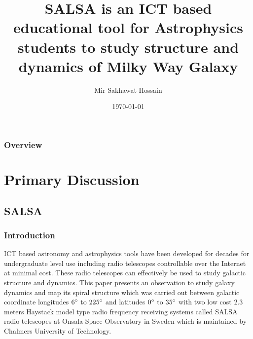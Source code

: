 \documentclass{beamer}
\title[SALSA]{SALSA is an ICT based educational tool for Astrophysics students to study structure and dynamics of Milky Way Galaxy } %
\author{Mir Sakhawat Hossain} %
\institute[KNC] %
{
Kabi Nazrul Govt. College,Dhaka \\ %
\medskip
\textit{s.hossain18@gmail.com} \\ %
\textit{\url{https://gitlab.com/sakhawat18/iccit-2018}} %
}
\date{\today} %
\begin{document}
\begin{frame}
\titlepage %
\end{frame}

\begin{frame}
\frametitle{Overview} %
\tableofcontents %
\end{frame}


\section{Primary Discussion} %

\subsection{SALSA} %

\begin{frame}
\frametitle{Introduction}
ICT based astronomy and astrophysics tools have been developed for decades for undergraduate level use including radio telescopes controllable over the Internet at minimal cost. These radio telescopes can effectively be used to study galactic structure and dynamics. This paper presents an observation to study galaxy dynamics and map its spiral structure which was carried out between galactic coordinate longitudes $6\degree$ to $225\degree$ and latitudes $0\degree$ to $35\degree$ with two low cost $2.3$ meters Haystack model type radio frequency receiving systems called SALSA radio telescopes at Onsala Space Observatory in Sweden which is maintained by Chalmers University of Technology.
\end{frame}
\end{document}
